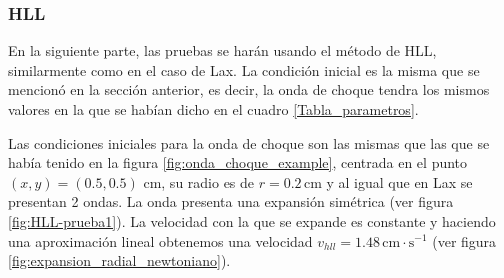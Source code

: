 \documentclass[12pt,a4paper]{book}
\begin{document}
\bigskip
%
%

\subsubsection{HLL}
En la siguiente parte, las pruebas se harán usando el método de HLL, similarmente como en el caso de Lax. La condición inicial es la misma que se mencionó en la sección anterior, es decir, la onda de choque tendra los mismos valores en la que se habían dicho en el cuadro \ref{Tabla_parametros}.	



Las condiciones iniciales para la onda de choque son las mismas que las que se había tenido en la figura \ref{fig:onda_choque_example}, centrada en el punto $(x,y)=(0.5,0.5)$ cm, su radio es de $r = 0.2 \, \mathrm{cm}$ y al igual que en Lax se presentan 2 ondas. La onda presenta una expansión simétrica (ver figura \ref{fig:HLL-prueba1}). La velocidad con la que se expande es constante y haciendo una aproximación lineal obtenemos una velocidad $v_{hll} = 1.48 \, \mathrm{cm} \cdot \mathrm{s}^{-1}$ (ver figura \ref{fig:expansion_radial_newtoniano}).
\end{document}
